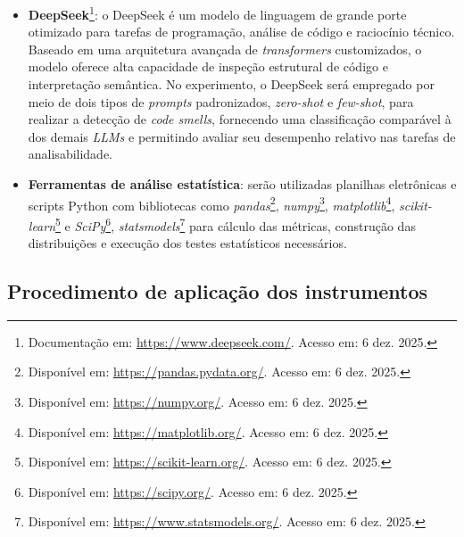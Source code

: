 \begin{itemize}
    \item \textbf{DeepSeek}\footnote{Documentação em: \href{https://www.deepseek.com/}{https://www.deepseek.com/}. Acesso em: 6 dez. 2025.}:
    o DeepSeek é um modelo de linguagem de grande porte otimizado para tarefas de
    programação, análise de código e raciocínio técnico. Baseado em uma arquitetura
    avançada de \textit{transformers} customizados, o modelo oferece alta capacidade de
    inspeção estrutural de código e interpretação semântica. No experimento, o DeepSeek 
    será empregado por meio de dois tipos de \textit{prompts} padronizados, \textit{zero-shot} 
    e \textit{few-shot}, para realizar a detecção de \textit{code smells}, fornecendo uma 
    classificação comparável à dos demais \textit{LLMs} e permitindo avaliar seu desempenho 
    relativo nas tarefas de analisabilidade.

    
    \item \textbf{Ferramentas de análise estatística}: serão utilizadas planilhas eletrônicas e scripts Python com bibliotecas como 
    \textit{pandas}\footnote{Disponível em: \href{https://pandas.pydata.org/}{https://pandas.pydata.org/}. Acesso em: 6 dez. 2025.},
    \textit{numpy}\footnote{Disponível em: \href{https://numpy.org/}{https://numpy.org/}. Acesso em: 6 dez. 2025.},
    \textit{matplotlib}\footnote{Disponível em: \href{https://matplotlib.org/}{https://matplotlib.org/}. Acesso em: 6 dez. 2025.},
    \textit{scikit-learn}\footnote{Disponível em: \href{https://scikit-learn.org/}{https://scikit-learn.org/}. Acesso em: 6 dez. 2025.} e
    \textit{SciPy}\footnote{Disponível em: \href{https://scipy.org/}{https://scipy.org/}. Acesso em: 6 dez. 2025.},
    \textit{statsmodels}\footnote{Disponível em: \href{https://www.statsmodels.org/}{https://www.statsmodels.org/}. Acesso em: 6 dez. 2025.}
    para cálculo das métricas, construção das distribuições e execução dos testes estatísticos necessários.
\end{itemize}

\subsection{Procedimento de aplicação dos instrumentos}

